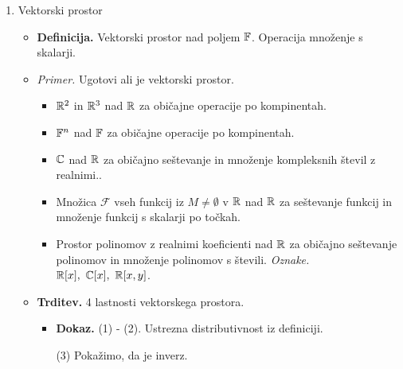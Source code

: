 \begin{enumerate}
    \newpage
    \item Vektorski prostor
    \begin{itemize}
        \item \colorbox{purple!30}{\textbf{Definicija.}} Vektorski prostor nad poljem $\mathbb{F}$. Operacija množenje s skalarji.
        \item \colorbox{yellow!30}{\emph{Primer.}} Ugotovi ali je vektorski prostor.       
            \begin{itemize}
                \item $\mathbb{R}^2$ in $\mathbb{R}^3$ nad $\mathbb{R}$ za običajne operacije po kompinentah.
                \item $\mathbb{F}^n$ nad $\mathbb{F}$ za običajne operacije po kompinentah.
                \item $\mathbb{C}$ nad $\mathbb{R}$ za običajno seštevanje in množenje kompleksnih števil z realnimi..
                \item Množica $\mathcal{F}$ vseh funkcij iz $M \neq \emptyset$ v $\mathbb{R}$ nad $\mathbb{R}$ za seštevanje funkcij in množenje funkcij s skalarji po točkah.                
                \item Prostor polinomov z realnimi koeficienti nad $\mathbb{R}$ za običajno seštevanje polinomov in množenje polinomov s števili. \emph{Oznake.} $\mathbb{R}[x], \ \mathbb{C}[x], \ \mathbb{R}[x,y]$.
            \end{itemize}
        \item \colorbox{blue!30}{\textbf{Trditev.}} 4 lastnosti vektorskega prostora.
        \begin{itemize}
            \item \colorbox{green!30}{\textbf{Dokaz.}} (1) - (2). Ustrezna distributivnost iz definiciji.\
            
            (3) Pokažimo, da je inverz. 


\end{itemize}
\end{itemize}
\end{enumerate}
